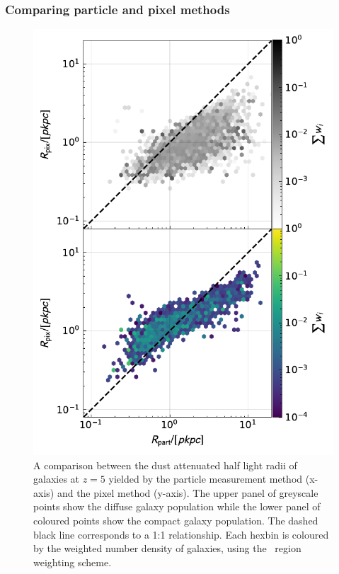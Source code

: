 \subsubsection{Comparing particle and pixel methods}

\begin{figure}
	\includegraphics[width=\columnwidth]{Figures/ComparisonHalfLightRadius_FAKE.TH.FUV_5.0_sim_Total_default.pdf}
    \caption{A comparison between the dust attenuated half light radii of galaxies at $z=5$ yielded by the particle measurement method (x-axis) and the pixel method (y-axis). The upper panel of greyscale points show the diffuse galaxy population while the lower panel of coloured points show the compact galaxy population. The dashed black line corresponds to a 1:1 relationship. Each hexbin is coloured by the weighted number density of galaxies, using the \flares\ region weighting scheme.}
    \label{fig:size_method_comp}
\end{figure}

